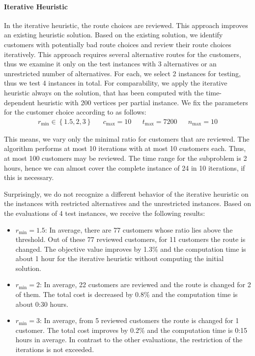 \paragraph{Iterative Heuristic} \parfill

In the iterative heuristic, the route choices are reviewed. This approach improves an existing heuristic solution. Based on the existing solution, we identify customers with potentially bad route choices and review their route choices iteratively. This approach requires several alternative routes for the customers, thus we examine it only on the test instances with 3 alternatives or an unrestricted number of alternatives. For each, we select 2 instances for testing, thus we test 4 instances in total. For comparability, we apply the iterative heuristic always on the solution, that has been computed with the time-dependent heuristic with 200 vertices per partial instance. We fix the parameters for the customer choice according to  as follows:
\begin{align*}
	r_{\min} \in\left\{1.5,2,3\right\} && c_{\max} = 10 && t_{\max} = 7200 && n_{\max} = 10
\end{align*}

This means, we vary only the minimal ratio for customers that are reviewed. The algorithm performs at most 10 iterations with at most 10 customers each. Thus, at most 100 customers may be reviewed. The time range for the subproblem is 2 hours, hence we can almost cover the complete instance of 24 in 10 iterations, if this is necessary.

Surprisingly, we do not recognize a different behavior of the iterative heuristic on the instances with restricted alternatives and the unrestricted instances. Based on the evaluations of 4 test instances, we receive the following results:
\begin{itemize}
	\item{$r_{\min} = 1.5$:}
In average, there are 77 customers whose ratio lies above the threshold. Out of these 77 reviewed customers, for 11 customers the route is changed. The objective value improves by 1.3\% and the computation time is about 1 hour for the iterative heuristic without computing the initial solution.
	\item{$r_{\min} = 2$:}
In average, 22 customers are reviewed and the route is changed for 2 of them. The total cost is decreased by 0.8\% and the computation time is about 0:30 hours.
	\item{$r_{\min} = 3$:}
In average, from 5 reviewed customers the route is changed for 1 customer. The total cost improves by 0.2\% and the computation time is 0:15 hours in average. In contrast to the other evaluations, the restriction of the iterations is not exceeded.
\end{itemize}

